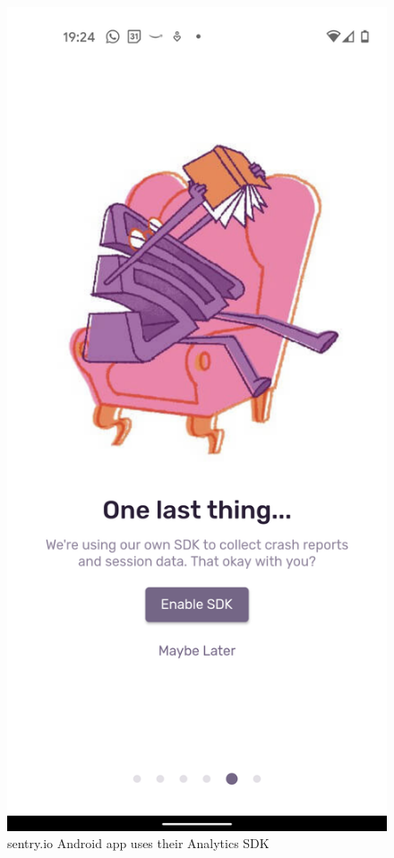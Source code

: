 \begin{figure}
    \centering
    \includegraphics{images/sentry.io/Screenshot_20210914-192435.png}
    \caption{sentry.io Android app uses their Analytics SDK}
    \label{fig:sentry-io-analytics-sdk-opt-in}
\end{figure}

